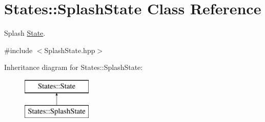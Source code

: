 \hypertarget{class_states_1_1_splash_state}{}\section{States\+::Splash\+State Class Reference}
\label{class_states_1_1_splash_state}


Splash \mbox{\hyperlink{class_states_1_1_state}{State}}.  




{\ttfamily \#include $<$Splash\+State.\+hpp$>$}

Inheritance diagram for States\+::Splash\+State\+:\begin{figure}[H]
\begin{center}
\leavevmode
\includegraphics[height=2.000000cm]{class_states_1_1_splash_state}
\end{center}
\end{figure}
